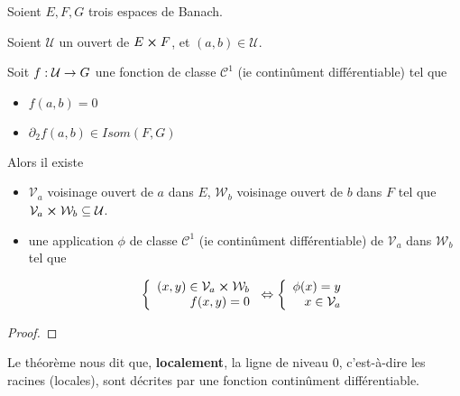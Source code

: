 \begin{theorem}
	\label{theorem:implicite_functions}
	Soient $E, F, G$ trois espaces de Banach.

	Soient $\mathcal{U}$ un ouvert de $E \cross F$, et $(a, b) \in
	\mathcal{U}$.

	Soit $f : \mathcal{U} \rightarrow G$ une fonction de classe
	$\mathcal{C}^{1}$ (ie continûment différentiable) tel que

	\begin{itemize}
		\item $f(a, b) = 0$
		\item $\partial_{2}f (a, b) \in Isom(F, G)$
	\end{itemize}

	Alors il existe

	\begin{itemize}
		\item $\mathcal{V}_{a}$ voisinage ouvert de $a$ dans $E$,
			$\mathcal{W}_{b}$ voisinage ouvert de $b$ dans $F$ tel que
			$\mathcal{V}_{a} \cross \mathcal{W}_{b} \subseteq \mathcal{U}$.
		\item une application $\phi$ de classe $\mathcal{C}^{1}$ (ie continûment
			différentiable) de $\mathcal{V}_{a}$ dans $\mathcal{W}_{b}$ tel que

			\begin{align*}
			\left\{
				\begin{array}{r c l}
					(x, y) \in \mathcal{V}_{a} \cross \mathcal{W}_{b} \\
					f(x, y) = 0
				\end{array}
			\right.
			\Leftrightarrow
			\left\{
				\begin{array}{r c l}
					\phi(x) = y \\
					x \in \mathcal{V}_{a}
				\end{array}
			\right.
			\end{align*}
	\end{itemize}
\end{theorem}

\ifdefined\outputproof
\begin{proof}

\end{proof}
\fi

\begin{remarque}
	Le théorème nous dit que, \textbf{localement}, la ligne de niveau $0$,
	c'est-à-dire les racines (locales), sont décrites par une fonction
	continûment différentiable.
\end{remarque}

